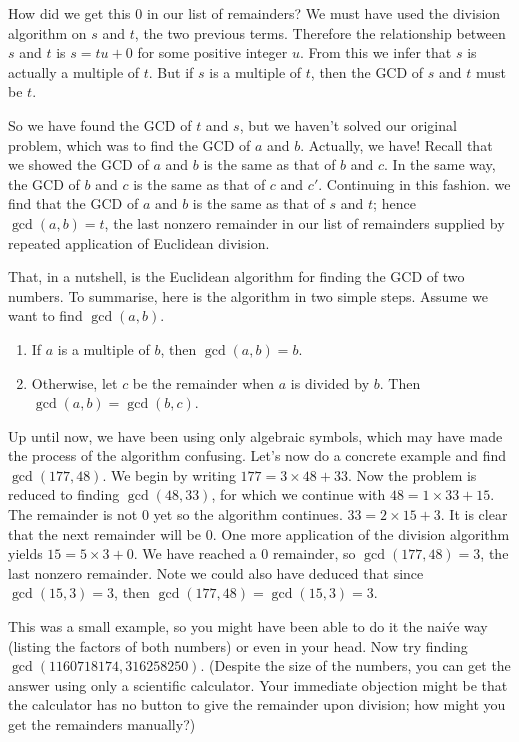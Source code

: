 \documentclass[a4paper,twocolumn]{article}
\begin{document}
How did we get this $0$ in our list of remainders? We must have used the division algorithm on $s$ and $t$,
the two previous terms. Therefore the relationship between $s$ and $t$ is
\(s=tu+0\)
for some positive integer $u$. From this we infer that $s$ is actually a multiple of $t$. But if $s$ is a multiple
of $t$, then the GCD of $s$ and $t$ must be $t$.

So we have found the GCD of $t$ and $s$, but we haven't solved our original problem, which was to
find the GCD of $a$ and $b$. Actually, we have! Recall that we showed the GCD of $a$ and $b$ is the same
as that of $b$ and $c$. In the same way, the GCD of $b$ and $c$ is the same as that of $c$ and $c'$. 
Continuing in this fashion. we find that the GCD of $a$ and $b$ is the same as that of $s$ and $t$; hence
$\gcd(a,b)=t$, the last nonzero remainder in our list of remainders supplied by repeated application of Euclidean division.

That, in a nutshell, is the Euclidean algorithm for finding the GCD of two numbers. To summarise, here is the
algorithm in two simple steps. Assume we want to find $\gcd(a,b)$.
\begin{enumerate}
\item If $a$ is a multiple of $b$, then $\gcd(a,b)=b$.
\item Otherwise, let $c$ be the remainder when $a$ is divided by $b$. Then $\gcd(a,b)=\gcd(b,c)$.
\end{enumerate}

Up until now, we have been using only algebraic symbols, which may have made the process of the algorithm
confusing. Let's now do a concrete example and find $\gcd(177,48)$. We begin by writing
\(177=3\times48+33.\)
Now the problem is reduced to finding $\gcd(48,33)$, for which we continue with
\(48=1\times33+15.\)
The remainder is not $0$ yet so the algorithm continues.
\(33=2\times15+3.\)
It is clear that the next remainder will be $0$. One more application
of the division algorithm yields
\(15=5\times3+0.\)
We have reached a $0$ remainder, so $\gcd(177,48)=3$, the last nonzero remainder. Note we could
also have deduced that since $\gcd(15,3)=3$, then $\gcd(177,48)=\gcd(15,3)=3.$

This was a small example, so you might have been able to do it the nai\'ve way (listing
the factors of both numbers) or even in your head. Now try finding \(\gcd(1160718174,316258250).\)
(Despite the size of the numbers, you can get the answer using only a scientific calculator. Your
immediate objection might be that the calculator has no button to give the remainder upon division;
how might you get the remainders manually?)
\end{document}
